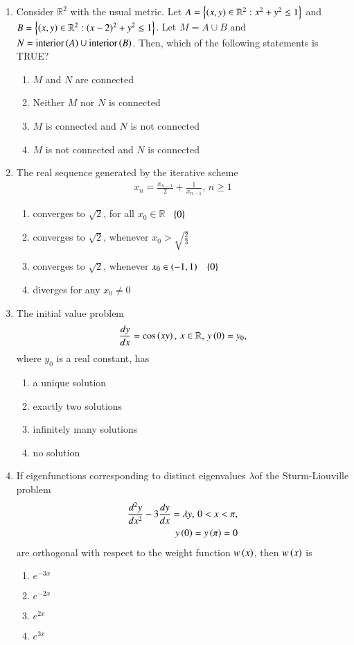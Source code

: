 \documentclass[journal,12pt,onecolumn]{IEEEtran}
\theoremstyle{remark}
\begin{document}
\begin{enumerate}
 \item Consider $\mathbb{R}^2$ with the usual metric. Let $A=\left\{\left(x,y\right) \in \mathbb{R}^2 : x^2+y^2 \leq 1\right\}$ and $B=\left\{\left(x,y\right) \in \mathbb{R}^2 : (x-2)^2+y^2 \leq 1\right\}$. Let $M=A \cup B$ and $N=\text{interior}\left(A\right) \cup \text{interior}\left(B\right)$. Then, which of the following statements is TRUE?
	 \begin{enumerate}
		\item $M$ and $N$ are connected
		\item Neither $M$ nor $N$ is connected
		\item $M$ is connected and $N$ is not connected
		\item $M$ is not connected and $N$ is connected
	\end{enumerate}

\item The real sequence generated by the iterative scheme
	\begin{align*}
		x_n=\frac{x_{n-1}}{2}+\frac{1}{x_{n-1}}, \, n\geq 1
	\end{align*}
 	
	\begin{enumerate}
		\item converges to $\sqrt{2}$, for all $x_0 \in \mathbb{R}$ \ $\left\{0\right\}$
		\item converges to $\sqrt{2}$, whenever $x_0 > \sqrt{\frac{2}{3}}$
		\item converges to $\sqrt{2}$, whenever $x_0 \in \left(-1,1\right)$ \ $\left\{0\right\}$
		\item diverges for any $x_0 \neq 0$
	\end{enumerate}

\item The initial value problem 
	\begin{align*}
		\frac{dy}{dx}= \cos \left(xy\right), \, x \in \mathbb{R}, \, y\left(0\right) =y_0,
	\end{align*}
 where $y_0$ is a real constant, has

 	\begin{enumerate}
		\item a unique solution
		\item exactly two solutions
		\item infinitely many solutions
		\item no solution
	\end{enumerate}

\item If eigenfunctions corresponding to distinct eigenvalues $\lambda$of the Sturm-Liouville problem 
	\begin{align*}
		\frac{d^2 y}{dx^2}-3\frac{dy}{dx}= \lambda y, \, 0<x<\pi, \\
		y\left(0\right)=y\left(\pi\right)=0
	\end{align*}
are orthogonal with respect to the weight function $w\left(x\right)$, then $w\left(x\right)$ is
	\begin{enumerate}
		\item $e^{-3x}$
		\item $e^{-2x}$
		\item $e^{2x}$
		\item $e^{3x}$
	\end{enumerate}


\end{enumerate}
\end{document}
